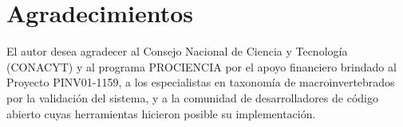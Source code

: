 \documentclass[onecolumn]{article}
\begin{document}
\section*{Agradecimientos}

El autor desea agradecer al Consejo Nacional de Ciencia y Tecnología (CONACYT) y al programa PROCIENCIA por el apoyo financiero brindado al Proyecto PINV01-1159, a los especialistas en taxonomía de macroinvertebrados por la validación del sistema, y a la comunidad de desarrolladores de código abierto cuyas herramientas hicieron posible su implementación.
\end{document}
